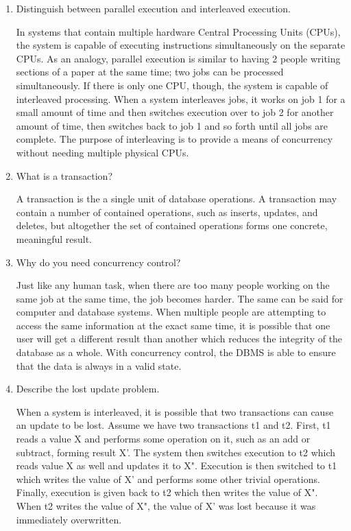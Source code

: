 \documentclass[11pt]{article}
\begin{document}
	
	\begin{enumerate}
		
		
		\item Distinguish between parallel execution and interleaved execution.
		
		In systems that contain multiple hardware Central Processing Units (CPUs), the system is capable of executing instructions simultaneously on the separate CPUs. As an analogy, parallel execution is similar to having 2 people writing sections of a paper at the same time; two jobs can be processed simultaneously. If there is only one CPU, though, the system is capable of interleaved processing. When a system interleaves jobs, it works on job 1 for a small amount of time and then switches execution over to job 2 for another amount of time, then switches back to job 1 and so forth until all jobs are complete. The purpose of interleaving is to provide a means of concurrency without needing multiple physical CPUs.
		
		\item What is a transaction?
		
		A transaction is the a single unit of database operations. A transaction may contain a number of contained operations, such as inserts, updates, and deletes, but altogether the set of contained operations forms one concrete, meaningful result.
		
		\item Why do you need concurrency control?
		
		Just like any human task, when there are too many people working on the same job at the same time, the job becomes harder. The same can be said for computer and database systems. When multiple people are attempting to access the same information at the exact same time, it is possible that one user will get a different result than another which reduces the integrity of the database as a whole. With concurrency control, the DBMS is able to ensure that the data is always in a valid state.
		
		\item Describe the lost update problem.
		
		When a system is interleaved, it is possible that two transactions can cause an update to be lost. Assume we have two transactions t1 and t2. First, t1 reads a value X and performs some operation on it, such as an add or subtract, forming result X'. The system then switches execution to t2 which reads value X as well and updates it to X". Execution is then switched to t1 which writes the value of X' and performs some other trivial operations. Finally, execution is given back to t2 which then writes the value of X". When t2 writes the value of X", the value of X' was lost because it was immediately overwritten.
		

\end{enumerate}
\end{document}
